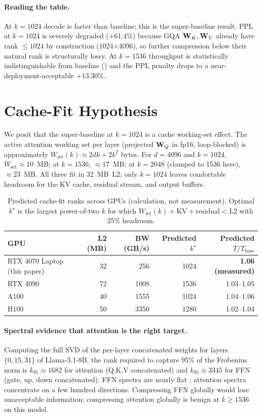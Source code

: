 \documentclass[11pt]{article}
\begin{document}
\paragraph{Reading the table.}
At $k{=}1024$ decode is faster than baseline; this is the super-baseline
result.  PPL at $k{=}1024$ is severely degraded (+61.4\%) because GQA
$\mathbf{W}_K,\mathbf{W}_V$ already have rank $\leq 1024$ by construction (1024$\times$4096),
so further compression below their natural rank is structurally lossy.  At
$k{=}1536$ throughput is statistically indistinguishable from baseline
() and the PPL penalty drops to a near-deployment-acceptable
+13.30\%.

\section{Cache-Fit Hypothesis}
\label{sec:cachefit}
We posit that the super-baseline at $k{=}1024$ is a cache working-set effect.
The active attention working set per layer (projected $\mathbf{W}_Q$ in fp16,
loop-blocked) is approximately $W_\text{set}(k) \approx 2 d k\!+\!2 k^2$ bytes.
For $d{=}4096$ and $k{=}1024$, $W_\text{set}\!\approx\!10$~MB; at $k{=}1536$,
$\approx\!17$~MB; at $k{=}2048$ (clamped to 1536 here), $\approx\!23$~MB.  All
three fit in 32~MB~L2; only $k{=}1024$ leaves comfortable headroom for the KV
cache, residual stream, and output buffers.

\begin{table}[h]\centering\small
\caption{Predicted cache-fit ranks across GPUs (calculation, not
measurement).  Optimal $k^\star$ is the largest power-of-two $k$ for which
$W_\text{set}(k)+\text{KV}+\text{residual}\!<\!\text{L2}$ with 25\% headroom.}
\label{tab:predict}
\begin{tabular}{@{}lrrrr@{}}
\toprule
GPU & L2 (MB) & BW (GB/s) & Predicted $k^\star$ & Predicted $T/T_\text{base}$ \\
\midrule
RTX 4070 Laptop (this paper) & 32 & 256 & 1024 & \textbf{1.06 (measured)} \\
RTX 4090 & 72 & 1008 & 1536 & 1.03--1.05 \\
A100 & 40 & 1555 & 1024 & 1.04--1.06 \\
H100 & 50 & 3350 & 1280 & 1.02--1.04 \\
\bottomrule
\end{tabular}
\end{table}

\paragraph{Spectral evidence that attention is the right target.}
Computing the full SVD of the per-layer concatenated weights for layers
$\{0,15,31\}$ of Llama-3.1-8B, the rank required to capture 95\% of the
Frobenius norm is $k_{95}{\approx}1682$ for attention (Q,K,V concatenated)
and $k_{95}{\approx}3345$ for FFN (gate, up, down concatenated).  FFN
spectra are nearly flat \cite{geva2021ffn}; attention spectra concentrate
on a few hundred directions.  Compressing FFN globally would lose
unacceptable information; compressing attention globally is benign at
$k\!\geq\!1536$ on this model.
\end{document}
